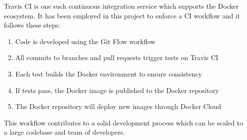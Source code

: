     Travis CI is one such continuous integration service which supports the Docker ecosystem. It has been employed in this project to enforce a CI workflow and it follows these steps:

    \begin{enumerate}
      \item Code is developed using the Git Flow workflow
      \item All commits to branches and pull requests trigger tests on Travis CI
      \item Each test builds the Docker environment to ensure consistency
      \item If tests pass, the Docker image is published to the Docker repository
      \item The Docker repository will deploy new images through Docker Cloud
    \end{enumerate}

    This workflow contributes to a solid development process which can be scaled to a large codebase and team of developers.